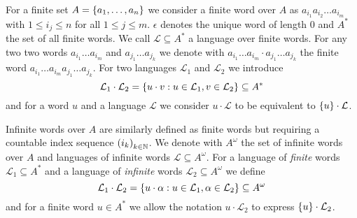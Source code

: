 For a finite set $A = \left\{a_{1},\dots, a_{n}\right\}$ we consider a finite word over
$A$ as $a_{i_{1}}a_{i_{2}}\dots a_{i_{m}}$ with $1\leq i_{j}\leq n$ for all 
$1\leq j\leq m$. $\epsilon$ denotes the unique word of length $0$ and $A^{*}$
the set of all finite words. We call $\mathcal{L}\subseteq A^{*}$ a language 
over finite words. For any two two words $a_{i_{1}}\dots a_{i_{m}}$ and
$a_{j_{1}}\dots a_{j_{k}}$ we denote with 
$a_{i_{1}}\dots a_{i_{m}}\cdot a_{j_{1}}\dots a_{j_{k}}$ the finite word
$a_{i_{1}}\dots a_{i_{m}}a_{j_{1}}\dots a_{j_{k}}$. For two languages 
$\mathcal{L}_{1}$ and $\mathcal{L}_{2}$ we introduce
\begin{equation*}
  \mathcal{L}_{1}\cdot\mathcal{L}_{2} = \left\{
    u\cdot v: u\in\mathcal{L}_{1}, v\in\mathcal{L}_{2}\right\}\subseteq A^{*}
\end{equation*}
and for a word $u$ and a language $\mathcal{L}$ we consider 
$u\cdot\mathcal{L}$ to be equivalent to $\left\{u\right\}\cdot\mathcal{L}$.

Infinite words over $A$ are similarly defined as finite words but requiring a
countable index sequence $\left(i_{k}\right)_{k\in\mathbb{N}}$. We denote with 
$A^{\omega}$ the set of infinite words over $A$ and languages of infinite 
words $\mathcal{L}\subseteq A^{\omega}$. For a language of \emph{finite} words
$\mathcal{L}_{1}\subseteq A^{*}$
and a language of \emph{infinite} words $\mathcal{L}_{2}\subseteq A^{\omega}$
we define
\begin{equation*}
  \mathcal{L}_{1}\cdot\mathcal{L}_{2} = \left\{
    u\cdot\alpha:u\in\mathcal{L}_{1}, \alpha\in\mathcal{L}_{2}\right\}
  \subseteq A^{\omega}
\end{equation*}
and for a finite word $u\in A^{*}$ we allow the notation
$u\cdot\mathcal{L}_{2}$ to express $\left\{u\right\}\cdot\mathcal{L}_{2}$.
